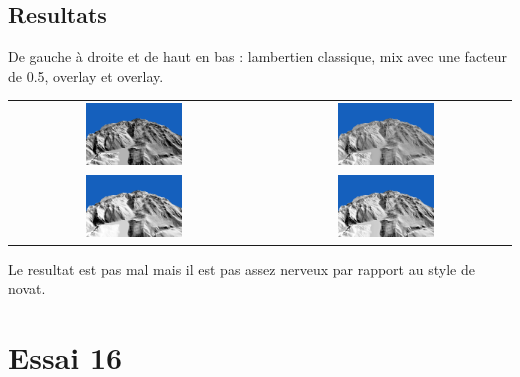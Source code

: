 \documentclass[a4paper]{article}
\begin{document}
\subsection{Resultats}

De gauche à droite et de haut en bas : lambertien classique, mix avec une facteur de 0.5, overlay et overlay. 


\begin{tabular}{cc}
\includegraphics[width=0.4\textwidth]{Images/Essais/Essai_15_phong.png}&
\includegraphics[width=0.4\textwidth]{Images/Essais/Essai_15_mix_05.png} \\
\includegraphics[width=0.4\textwidth]{Images/Essais/Essai_15_overlay.png}&
\includegraphics[width=0.4\textwidth]{Images/Essais/Essai_15_overlay_remap.png}\\
\end{tabular}


Le resultat est pas mal mais il est pas assez nerveux par rapport au style de novat. 


\section{Essai 16}
\end{document}
